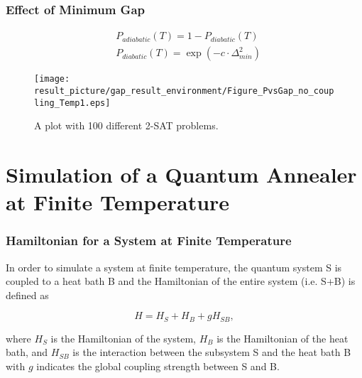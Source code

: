 \documentclass{beamer}
\begin{document}
\begin{frame}
	\frametitle{Effect of Minimum Gap}
		\begin{equation*}
		\begin{split}
		&P_{adiabatic}(T) = 1-P_{diabatic}(T)\\
		&P_{diabatic}(T) = \exp(-c\cdot \Delta_{min}^2)
		\end{split}
		\end{equation*}
	\begin{figure}
		\centering
		\texttt{[image: result\_picture/gap\_result\_environment/Figure\_PvsGap\_no\_coupling\_Temp1.eps]}
		
		 \caption{A plot with 100 different 2-SAT problems.}
	\end{figure}
\end{frame}




\section{Simulation of a Quantum Annealer at Finite Temperature}

\begin{frame}
	\frametitle{Hamiltonian for a System at Finite Temperature}
	In order to simulate a system at finite temperature, the quantum system S is coupled to a heat bath B and the Hamiltonian of the entire system (i.e. S+B) is defined as
	
	\begin{equation*}
	H = H_S + H_B + gH_{SB},
	\end{equation*} 
	
	where $H_S$ is the Hamiltonian of the system, $H_B$ is the Hamiltonian of the heat bath, and $H_{SB}$ is the interaction between the subsystem S and the heat bath B with $g$ indicates the global coupling strength between S and B. 
\end{frame}
\end{document}
